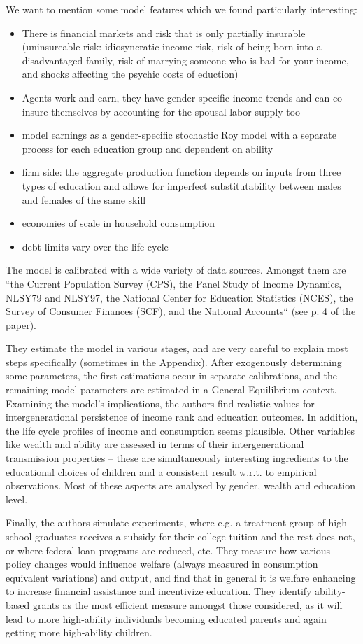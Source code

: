 \documentclass[12pt,a4paper,xcolor=dvipsnames]{article}
\begin{document}
We want to mention some model features which we found particularly interesting:
\begin{itemize}
    \item There is financial markets and risk that is only partially insurable (uninsureable risk: idiosyncratic income risk, risk of being born into a disadvantaged family, risk of marrying someone who is bad for your income, and shocks affecting the psychic costs of eduction)
    \item Agents work and earn, they have gender specific income trends and can co-insure themselves by accounting for the spousal labor supply too
    \item model earnings as a gender-specific stochastic Roy model with a separate process for each education group and dependent on ability
    \item firm side: the aggregate production function depends on inputs from three types of education and allows for imperfect substitutability between males and females of the same skill
    \item economies of scale in household consumption
    \item debt limits vary over the life cycle
\end{itemize}

The model is calibrated with a wide variety of data sources. Amongst them are “the Current Population Survey (CPS), the Panel Study of Income Dynamics, NLSY79 and NLSY97, the National Center for Education Statistics (NCES), the Survey of Consumer Finances (SCF), and the National Accounts“ (see p. 4 of the paper). 

They estimate the model in various stages, and are very careful to explain most steps specifically (sometimes in the Appendix). After exogenously determining some parameters, the first estimations occur in separate calibrations, and the remaining model parameters are estimated in a General Equilibrium context. 
 Examining the model’s implications, the authors find realistic values for intergenerational persistence of income rank and education outcomes. In addition, the life cycle profiles of income and consumption seems plausible. Other variables like wealth and ability are assessed in terms of their intergenerational transmission properties – these are simultaneously interesting ingredients to the educational choices of children and a consistent result w.r.t. to empirical observations. Most of these aspects are analysed by gender, wealth and education level. 
 
Finally, the authors simulate experiments, where e.g. a treatment group of high school graduates receives a subsidy for their college tuition and the rest does not, or where federal loan programs are reduced, etc. They measure how various policy changes would influence welfare (always measured in consumption equivalent variations) and output, and find that in general it is welfare enhancing to increase financial assistance and incentivize education. They identify ability-based grants as the most efficient measure amongst those considered, as it will lead to more high-ability individuals becoming educated parents and again getting more high-ability children. 


\pagebreak
\end{document}
